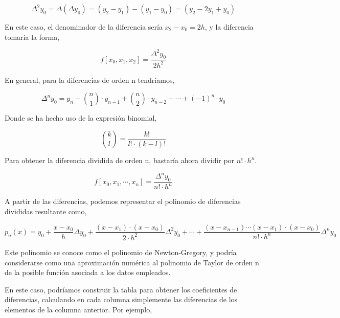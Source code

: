 \begin{equation*}
\Delta^2 y_0=\Delta \left(\Delta y_0 \right) =(y_2-y_1)-(y_1-y_0)=(y_2-2y_1+y_0)
\end{equation*}
\begin{paracol}{2}
En este caso, el denominador de la diferencia sería $x_2-x_0=2h$, y la diferencia tomaría la forma,
\end{paracol}
\begin{equation*}
f[x_0,x_1,x_2]=\frac{\Delta^2y_0}{2h^2}
\end{equation*}
\begin{paracol}{2}
En general, para la diferencias de orden n tendríamos,
\end{paracol}
\begin{equation*}
\Delta^n y_0=y_n-\binom{n}{1}\cdot y_{n-1}+\binom{n}{2}\cdot y_{n-2}-\cdots+(-1)^n\cdot y_0
\end{equation*}
\begin{paracol}{2}
Donde se ha hecho uso de la expresión binomial,
\end{paracol}
\begin{equation*}
\binom{k}{l}=\frac{k!}{l!\cdot(k-l)!}
\end{equation*}
\begin{paracol}{2}
Para obtener la diferencia dividida de orden n, bastaría ahora dividir por $n!\cdot h^n$.
\end{paracol}
\begin{equation*}
f\left[x_0,x_1,\cdots,x_n\right]=\frac{\Delta^n y_0}{n!\cdot h^n}
\end{equation*}
\begin{paracol}{2}
A partir de las diferencias, podemos representar el polinomio de diferencias divididas resultante como,
\end{paracol}
\begin{equation*}
p_n(x)=y_0+\frac{x-x_0}{h}\Delta y_0+\frac{(x-x_1)\cdot (x-x_0)}{2\cdot h^2}\Delta^2 y_0+\cdots +\frac{(x-x_{n-1}) \cdots (x-x_1)\cdot (x-x_0)}{n! \cdot h^n}\Delta^n y_0
\end{equation*}
\begin{paracol}{2}
Este polinomio se conoce como el polinomio de Newton-Gregory, y podría considerarse como una aproximación  numérica al polinomio de Taylor de orden n de la posible función asociada a los datos empleados. 

En este caso, podríamos construir la tabla para obtener los coeficientes de diferencias, calculando en cada columna simplemente las diferencias de los elementos de la columna anterior. Por ejemplo,
\end{paracol}
